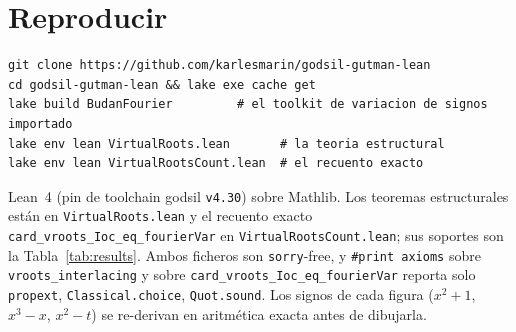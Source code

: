 \documentclass[11pt]{article}
\newcommand{\lean}[1]{\texttt{#1}}
\begin{document}
\section*{Reproducir}
\begin{verbatim}
git clone https://github.com/karlesmarin/godsil-gutman-lean
cd godsil-gutman-lean && lake exe cache get
lake build BudanFourier         # el toolkit de variacion de signos importado
lake env lean VirtualRoots.lean       # la teoria estructural
lake env lean VirtualRootsCount.lean  # el recuento exacto
\end{verbatim}
{\sloppy Lean~4 (pin de toolchain godsil \lean{v4.30}) sobre Mathlib. Los teoremas estructurales est\'an en
\lean{VirtualRoots.lean} y el recuento exacto \lean{card\_vroots\_Ioc\_eq\_fourierVar} en
\lean{VirtualRootsCount.lean}; sus soportes son la Tabla~\ref{tab:results}. Ambos ficheros son
\lean{sorry}-free, y \lean{\#print axioms} sobre \lean{vroots\_interlacing} y sobre
\lean{card\_vroots\_Ioc\_eq\_fourierVar} reporta solo \lean{propext}, \lean{Classical.choice},
\lean{Quot.sound}. Los signos de cada figura ($x^2+1$, $x^3-x$, $x^2-t$) se re-derivan en aritm\'etica
exacta antes de dibujarla.\par}
\end{document}
